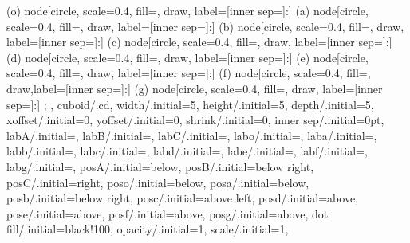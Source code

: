 {{{         %
         (o) node[circle, scale=0.4, fill=, draw, label={[inner sep=]:}] {}
         (a) node[circle, scale=0.4, fill=, draw, label={[inner sep=]:}] {}
         (b) node[circle, scale=0.4, fill=, draw, label={[inner sep=]:}] {}
         (c) node[circle, scale=0.4, fill=, draw, label={[inner sep=]:}] {}
         (d) node[circle, scale=0.4, fill=, draw, label={[inner sep=]:}] {}
         (e) node[circle, scale=0.4, fill=, draw, label={[inner sep=]:}] {}
         (f) node[circle, scale=0.4, fill=, draw,label={[inner sep=]:}] {}
         (g) node[circle, scale=0.4, fill=, draw, label={[inner sep=]:}] {}
    ;
  }},
  cuboid/.cd,
  width/.initial=5,
  height/.initial=5,
  depth/.initial=5,
  xoffset/.initial=0,
  yoffset/.initial=0,
  shrink/.initial=0,
  inner sep/.initial=0pt,
  labA/.initial=,
  labB/.initial=,
  labC/.initial=,
  labo/.initial=,
  laba/.initial=,
  labb/.initial=,
  labc/.initial=,
  labd/.initial=,
  labe/.initial=,
  labf/.initial=,
  labg/.initial=,
  posA/.initial=below,
  posB/.initial=below right,
  posC/.initial=right,
  poso/.initial=below,
  posa/.initial=below,
  posb/.initial=below right,
  posc/.initial=above left,
  posd/.initial=above,
  pose/.initial=above,
  posf/.initial=above,
  posg/.initial=above,
  dot fill/.initial=black!100,
  opacity/.initial=1,
  scale/.initial=1,
}

